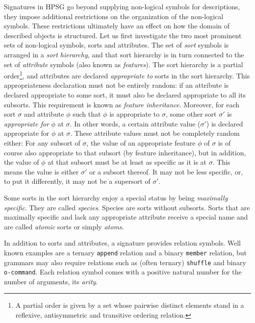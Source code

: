\documentclass[output=paper
                ,modfonts
                ,nonflat
	        ,collection
	        ,collectionchapter
	        ,collectiontoclongg
 	        ,biblatex
                ,babelshorthands
                ,newtxmath
                ,draftmode
                ,colorlinks, citecolor=brown
]{./langsci/langscibook}
\begin{document}
{Signatures in HPSG go beyond supplying non-logical symbols for
descriptions, they impose additional restrictions on the
organization of the non-logical symbols. These restrictions ultimately have an effect on
how the domain of described objects is structured. Let us first
investigate the two most prominent sets of non-logical symbols, sorts
and attributes. The set of \emph{sort} symbols is arranged in a
\emph{sort hierarchy}, and that sort hierarchy is in turn connected to
the set of \emph{attribute} symbols (also known as
\emph{features}). The sort hierarchy is a partial order\footnote{A partial order is given by a set whose pairwise distinct elements stand in a reflexive,
antisymmetric and transitive ordering relation.}, and
attributes are declared \emph{appropriate to} sorts
in the sort hierarchy. This appropriateness declaration must not be
entirely random: if an attribute is declared appropriate to some sort,
it must also be declared appropriate to all its subsorts. This requirement
is known as \emph{feature inheritance}.  Moreover, for each
sort $\sigma$ and attribute $\phi$ such that $\phi$ is appropriate to
$\sigma$, some other sort $\sigma'$ is \emph{appropriate for} $\phi$
at $\sigma$. In other words, a certain attribute value ($\sigma'$) is declared
appropriate for $\phi$ at $\sigma$. These attribute values must not be
completely random either: For any subsort of $\sigma$, the value of an
appropriate feature $\phi$ of $\sigma$ is of course also appropriate
to that subsort (by feature inheritance), but in addition, the value of $\phi$ at that subsort
must be at least as specific as it is at $\sigma$. This means the value is either
$\sigma'$ or a subsort thereof. It may not be less specific, or, to put
it differently, it may not be a
supersort of $\sigma'$.

Some sorts in the sort hierarchy enjoy a special status by being
\emph{maximally specific}. They are called \emph{species}. Species
are sorts without subsorts.
Sorts that are maximally specific and lack any appropriate attribute receive
a special name and are called \emph{atomic} sorts or simply \emph{atoms}.

In addition to sorts and attributes, a signature provides relation
symbols.  Well known examples are a ternary \texttt{append} relation
and a binary \texttt{member} relation, but grammars may also require
relations such as (often ternary) \texttt{shuffle} and binary
\texttt{o-command}. Each relation symbol comes with
a positive natural number for the number of arguments, its \emph{arity}.


}
\end{document}
